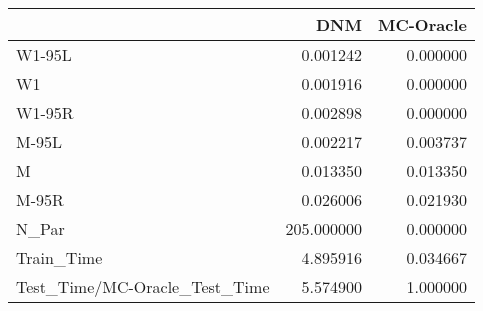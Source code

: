 \begin{tabular}{lrr}
\toprule
{} &         DNM &  MC-Oracle \\
\midrule
W1-95L                        &    0.001242 &   0.000000 \\
W1                            &    0.001916 &   0.000000 \\
W1-95R                        &    0.002898 &   0.000000 \\
M-95L                         &    0.002217 &   0.003737 \\
M                             &    0.013350 &   0.013350 \\
M-95R                         &    0.026006 &   0.021930 \\
N\_Par                         &  205.000000 &   0.000000 \\
Train\_Time                    &    4.895916 &   0.034667 \\
Test\_Time/MC-Oracle\_Test\_Time &    5.574900 &   1.000000 \\
\bottomrule
\end{tabular}
